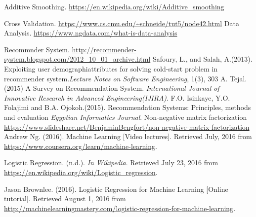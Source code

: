 \begin{thebibliography}{9}
	Additive Smoothing. \url{https://en.wikipedia.org/wiki/Additive_smoothing}

Cross Validation. \url{https://www.cs.cmu.edu/~schneide/tut5/node42.html}
Data Analysis. \url{https://www.ngdata.com/what-is-data-analysis}

 Recommnder System. \url{http://recommender-system.blogspot.com/2012_10_01_archive.html}
	 Safoury, L., and Salah, A.(2013). Exploiting user demographiattributes for solving cold-start problem in recommender system.\textit{Lecture Notes on Software Engineering}, 1(3), 303
	A. Tejal.(2015) A Survey on Recommendation System. \textit{International Journal of Innovative Research in Advanced Engineering(IJIRA)}.
	F.O. Isinkaye, Y.O. Folajimi and B.A. Ojokoh.(2015). Recommendation Systems: Principles, methods and evaluation \textit{Egyptian Informatics Journal}.
	Non-negative matrix factorization \url{https://www.slideshare.net/BenjaminBengfort/non-negative-matrix-factorization}
  Andrew Ng. (2016). Machine Learning [Video lectures].
  Retrieved July, 2016 from \url{https://www.coursera.org/learn/machine-learning}.

  Logistic Regression. (n.d.). {\em In Wikipedia}. Retrieved July 23, 2016 from
  \url{https://en.wikipedia.org/wiki/Logistic_regression}.

  Jason Brownlee. (2016). Logistic Regression for Machine Learning [Online tutorial].
  Retrieved August 1, 2016 from
  \url{http://machinelearningmastery.com/logistic-regression-for-machine-learning}.

\end{thebibliography}
